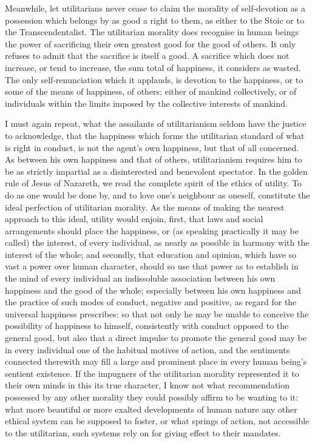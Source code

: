 \documentclass[12pt]{report}
\begin{document}
Meanwhile, let utilitarians never cease to claim the morality of self-devotion as a possession which belongs by as good a right to them, as either to the Stoic or to the Transcendentalist. The utilitarian morality does recognise in human beings the power of sacrificing their own greatest good for the good of others. It only refuses to admit that the sacrifice is itself a good. A sacrifice which does not increase, or tend to increase, the sum total of happiness, it considers as wasted. The only self-renunciation which it applauds, is devotion to the happiness, or to some of the means of happiness, of others; either of mankind collectively, or of individuals within the limits imposed by the collective interests of mankind.

I must again repeat, what the assailants of utilitarianism seldom have the justice to acknowledge, that the happiness which forms the utilitarian standard of what is right in conduct, is not the agent's own happiness, but that of all concerned. As between his own happiness and that of others, utilitarianism requires him to be as strictly impartial as a disinterested and benevolent spectator. In the golden rule of Jesus of Nazareth, we read the complete spirit of the ethics of utility. To do as one would be done by, and to love one's neighbour as oneself, constitute the ideal perfection of utilitarian morality. As the means of making the nearest approach to this ideal, utility would enjoin, first, that laws and social arrangements should place the happiness, or (as speaking practically it may be called) the interest, of every individual, as nearly as possible in harmony with the interest of the whole; and secondly, that education and opinion, which have so vast a power over human character, should so use that power as to establish in the mind of every individual an indissoluble association between his own happiness and the good of the whole; especially between his own happiness and the practice of such modes of conduct, negative and positive, as regard for the universal happiness prescribes: so that not only he may be unable to conceive the possibility of happiness to himself, consistently with conduct opposed to the general good, but also that a direct impulse to promote the general good may be in every individual one of the habitual motives of action, and the sentiments connected therewith may fill a large and prominent place in every human being's sentient existence. If the impugners of the utilitarian morality represented it to their own minds in this its true character, I know not what recommendation possessed by any other morality they could possibly affirm to be wanting to it: what more beautiful or more exalted developments of human nature any other ethical system can be supposed to foster, or what springs of action, not accessible to the utilitarian, such systems rely on for giving effect to their mandates.
\end{document}
